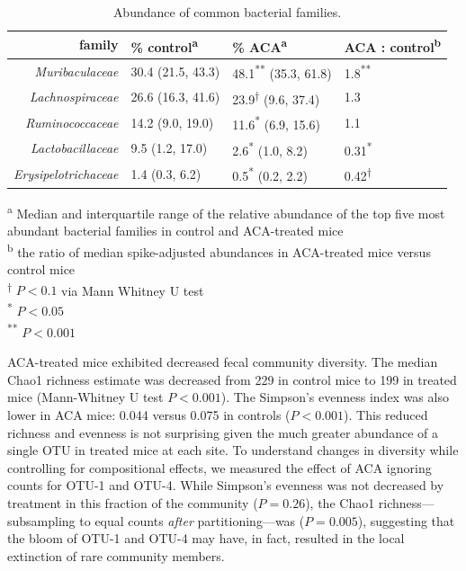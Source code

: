 \documentclass{doc/template/bmcart-nofigbox}
\newcommand{\frnlang}[1]{\textit{#1}}
\newcommand{\taxon}[1]{\frnlang{#1}}
\begin{document}
\begin{table}[h]
\caption{\label{tbl:aca_family}Abundance of common bacterial families.}
  \begin{tabular}{rlll}
    \hline
    family                      & \% control\textsuperscript{a}  & \% ACA\textsuperscript{a}              & ACA : control\textsuperscript{b} \\
    \hline
    \taxon{Muribaculaceae}      & 30.4 (21.5, 43.3)              & 48.1\textsuperscript{**} (35.3, 61.8) & 1.8\textsuperscript{**} \\
    \taxon{Lachnospiraceae}     & 26.6 (16.3, 41.6)              & 23.9\textsuperscript{†}  (9.6, 37.4)  & 1.3 \\
    \taxon{Ruminococcaceae}     & 14.2 (9.0, 19.0)               & 11.6\textsuperscript{*}  (6.9, 15.6)  & 1.1 \\
    \taxon{Lactobacillaceae}    & 9.5  (1.2, 17.0)               & 2.6\textsuperscript{*}   (1.0, 8.2)   & 0.31\textsuperscript{*} \\
    \taxon{Erysipelotrichaceae} & 1.4  (0.3, 6.2)                & 0.5\textsuperscript{*}   (0.2, 2.2)   & 0.42\textsuperscript{†} \\
    \hline
  \end{tabular}
  \vspace{2mm}
  \begin{flushleft}
  \textsuperscript{a} Median and interquartile range of the relative abundance of the
  top five most abundant bacterial families in control and ACA-treated mice \\
  \textsuperscript{b} the ratio of median spike-adjusted abundances in ACA-treated mice versus control mice \\
  \textsuperscript{†}  $P < 0.1$   via Mann Whitney U test \\
  \textsuperscript{*}  $P < 0.05$  \\
  \textsuperscript{**} $P < 0.001$ \\
  \end{flushleft}
\end{table}



ACA-treated mice exhibited decreased fecal community diversity.
The median Chao1 richness estimate was decreased from
229 in control mice to 199 in treated mice
(Mann-Whitney U test $P < 0.001$).
The Simpson's evenness index was also lower in ACA mice:
0.044 versus 0.075 in controls ($P < 0.001$).
This reduced richness and evenness is not surprising given the much greater
abundance of a single OTU in treated mice at each site.
To understand changes in diversity while controlling for compositional effects,
we measured the effect of ACA ignoring counts for OTU-1 and OTU-4.
While Simpson's evenness was not decreased by treatment in this fraction of
the community ($P = 0.26$), the Chao1 richness---subsampling to equal counts
\emph{after} partitioning---was ($P = 0.005$),
suggesting that the bloom of OTU-1 and OTU-4 may have, in fact, resulted in the
local extinction of rare community members.
\end{document}
